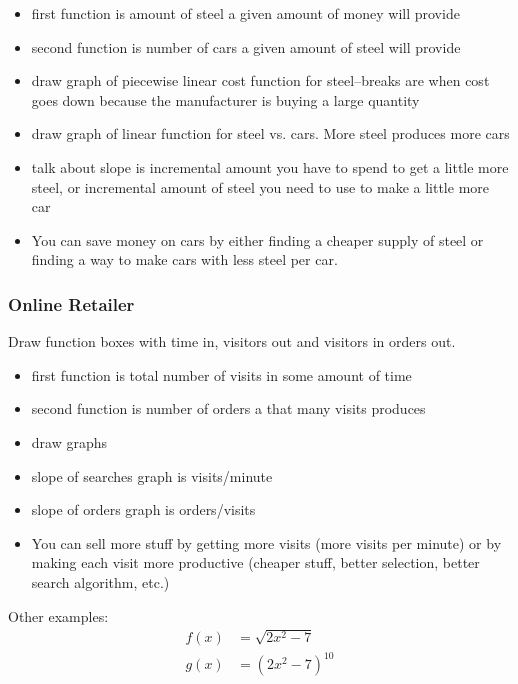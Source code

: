 \documentclass[letterpaper, landscape]{exam}
\begin{document}
  \begin{itemize}
    \item first function is amount of steel a given amount of money will provide
    \item second function is number of cars a given amount of steel will provide
    \item draw graph of piecewise linear cost function for steel--breaks are
      when cost goes down
      because the manufacturer is buying a large quantity
    \item draw graph of linear function for steel vs. cars. More steel produces more cars
    \item talk about slope is incremental amount you have to spend to get a
      little more steel, or incremental amount of steel you need to use to make
      a little more car
    \item You can save money on cars by either finding a cheaper supply of
      steel or finding a way to make cars with less steel per car.
  \end{itemize}

  \subsubsection{Online Retailer} %
  
  Draw function boxes with time in, visitors out and visitors in orders out.

  \begin{itemize}
    \item first function is total number of visits in some amount of time
    \item second function is number of orders a that many visits produces
    \item draw graphs 
    \item slope of searches graph is visits/minute
    \item slope of orders graph is orders/visits
    \item You can sell more stuff by getting more visits (more visits per
      minute) or by making each visit more productive (cheaper stuff, better
      selection, better search algorithm, etc.)
  \end{itemize}

  Other examples:
  \begin{align*}
    f(x) & = \sqrt{2x^2 - 7} \\
    g(x) & = \left( 2x^2 - 7 \right)^{10} \\
  \end{align*}
\end{document}
